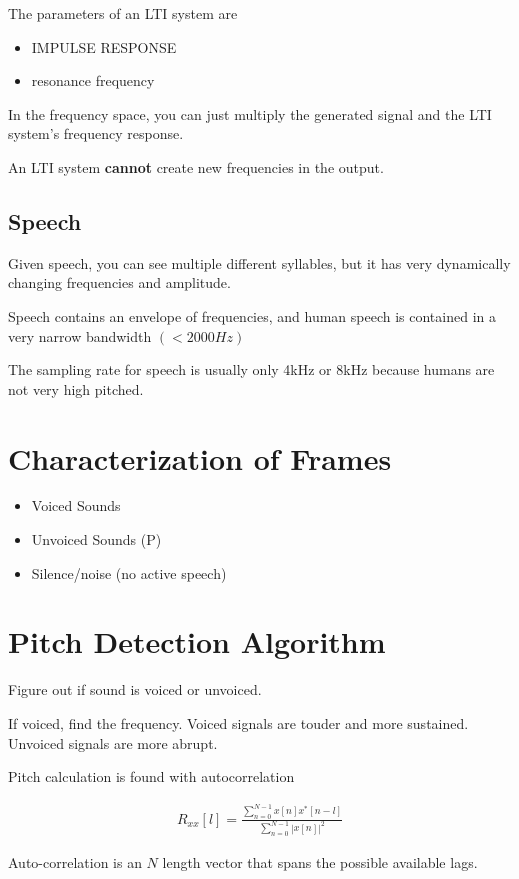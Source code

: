 \documentclass[fleqn]{report}
\newcommand{\equations} [1] {
\begin{gather*}
#1
\end{gather*}
}
\begin{document}
The parameters of an LTI system are
\begin{itemize}
    \item 
    IMPULSE RESPONSE 
    \item 
    resonance frequency 
\end{itemize}

In the frequency space, you can just multiply the generated signal 
and the LTI system's frequency response. 

An LTI system \textbf{cannot} create new frequencies in the output.

\subsection{Speech}
Given speech, you can see multiple different syllables, but it 
has very dynamically changing frequencies and amplitude.

Speech contains an envelope of frequencies, and human speech 
is contained in a very narrow bandwidth $(< 2000Hz)$

The sampling rate for speech is usually only 4kHz or 8kHz because 
humans are not very high pitched.

\section{Characterization of Frames}
\begin{itemize}
    \item
    Voiced Sounds
    \item
    Unvoiced Sounds (P)
    \item
    Silence/noise (no active speech)
\end{itemize}

\section{Pitch Detection Algorithm}
Figure out if sound is voiced or unvoiced. 

If voiced, find the frequency. Voiced signals are touder and more sustained.
Unvoiced signals are more abrupt. 

Pitch calculation is found with autocorrelation 
\equations{
    R_{xx}[l]
    =
    \frac{
        \sum_{n=0}^{N-1}
        x[n] x^*[n-l]
    }
    {
        \sum_{n=0}^{N-1}
        |x[n]|^2
    }
}

Auto-correlation is an $N$ length vector that spans the possible
available lags.
\end{document}
